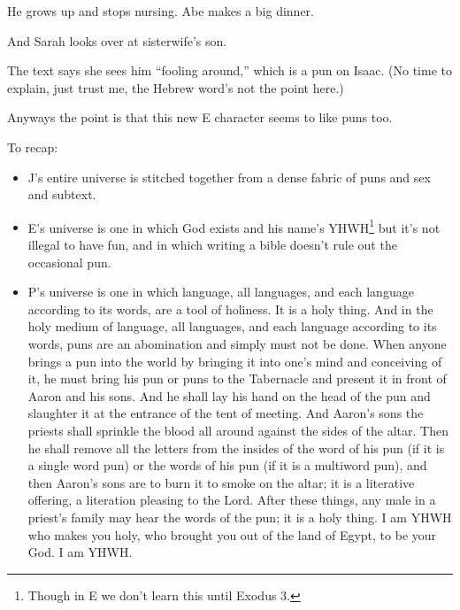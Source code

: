 {
}
{
}
{
	He grows up and stops nursing. Abe makes a big dinner.
}

{
}
{
}
{
	And Sarah looks over at sisterwife's son.

	The text says she sees him ``fooling around,'' which is a pun on Isaac. (No time to explain, just trust me, the Hebrew word's not the point here.)


	Anyways the point is that this new E character seems to like puns too.

	To recap:

	\begin{itemize}
	\item J's entire universe is stitched together from a dense fabric of puns and sex and subtext.
	\item E's universe is one in which God exists and his name's YHWH\footnote{Though in E we don't learn this until Exodus 3.} but it's not illegal to have fun, and in which writing a bible doesn't rule out the occasional pun.
	\item P's universe is one in which language, all languages, and each language according to its words, are a tool of holiness. It is a holy thing. And in the holy medium of language, all languages, and each language according to its words, puns are an abomination and simply must not be done. When anyone brings a pun into the world by bringing it into one's mind and conceiving of it, he must bring his pun or puns to the Tabernacle and present it in front of Aaron and his sons. And he shall lay his hand on the head of the pun and slaughter it at the entrance of the tent of meeting. And Aaron's sons the priests shall sprinkle the blood all around against the sides of the altar. Then he shall remove all the letters from the insides of the word of his pun (if it is a single word pun) or the words of his pun (if it is a multiword pun), and then Aaron's sons are to burn it to smoke on the altar; it is a literative offering, a literation pleasing to the Lord. After these things, any male in a priest’s family may hear the words of the pun; it is a holy thing. I am YHWH who makes you holy, who brought you out of the land of Egypt, to be your God. I am YHWH.
	\end{itemize}

}

